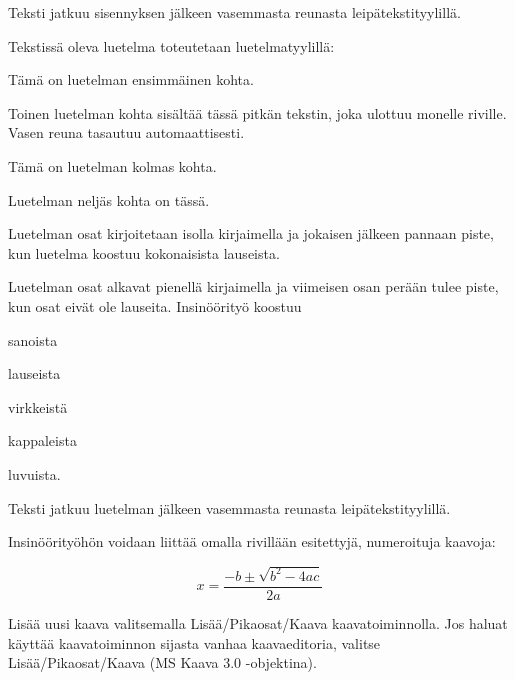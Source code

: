 Teksti jatkuu sisennyksen jälkeen vasemmasta reunasta leipätekstityylillä.

Tekstissä oleva luetelma toteutetaan luetelmatyylillä:

\begin{bullet-list}
  \item Tämä on luetelman ensimmäinen kohta.
  \item Toinen luetelman kohta sisältää tässä pitkän tekstin, joka ulottuu monelle riville. Vasen reuna tasautuu automaattisesti.
  \item Tämä on luetelman kolmas kohta.
  \item Luetelman neljäs kohta on tässä.
\end{bullet-list}

Luetelman osat kirjoitetaan isolla kirjaimella ja jokaisen jälkeen pannaan piste, kun luetelma koostuu kokonaisista lauseista.

Luetelman osat alkavat pienellä kirjaimella ja viimeisen osan perään tulee piste, kun osat eivät ole lauseita. Insinöörityö koostuu

\begin{bullet-list}
  \item sanoista
  \item lauseista
  \item virkkeistä
  \item kappaleista
  \item luvuista.
\end{bullet-list}

Teksti jatkuu luetelman jälkeen vasemmasta reunasta leipätekstityylillä.

Insinöörityöhön voidaan liittää omalla rivillään esitettyjä, numeroituja kaavoja:

\begin{equation}
  x = \frac{-b \pm \sqrt{b^{2} - 4ac}}{2a}
\end{equation}

Lisää uusi kaava valitsemalla Lisää/Pikaosat/Kaava kaavatoiminnolla. Jos haluat käyttää kaavatoiminnon sijasta vanhaa kaavaeditoria, valitse Lisää/Pikaosat/Kaava (MS Kaava 3.0 -objektina).